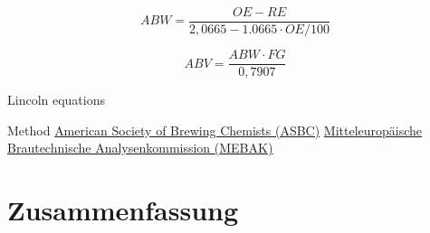 \documentclass[a4paper,parskip=half]{scrartcl}
\newcommand{\fg}{\mathit{FG}}
\newcommand{\abv}{\mathit{ABV}}
\newcommand{\abw}{\mathit{ABW}}
\newcommand{\oex}{\mathit{OE}}
\newcommand{\rex}{\mathit{RE}}
\begin{document}
\begin{equation}
\abw = \frac{\oex - \rex}{2,0665 - 1.0665 \cdot \oex / 100}
\end{equation}

\begin{equation}
\abv = \frac{\abw \cdot \fg}{0,7907}
\end{equation}

Lincoln equations
\autocite{Spedding2016}

Method \href{https://www.asbcnet.org}{American Society of Brewing Chemists (ASBC)} \href{https://www.mebak.org}{Mitteleuropäische Brautechnische Analysenkommission (MEBAK)}



\section*{Zusammenfassung}

\printbibliography[title=Quellen]
\end{document}
